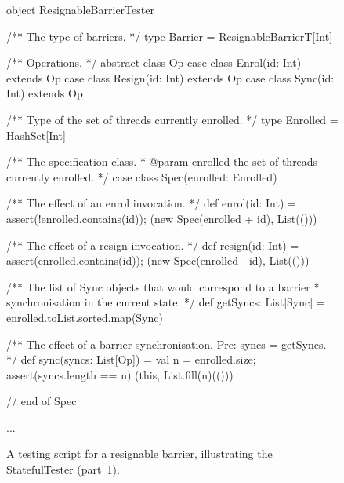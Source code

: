 
\begin{figure}
\begin{scala}
object ResignableBarrierTester{
  /** The type of barriers. */
  type Barrier = ResignableBarrierT[Int]

  /** Operations. */
  abstract class Op
  case class Enrol(id: Int) extends Op
  case class Resign(id: Int) extends Op
  case class Sync(id: Int) extends Op

  /** Type of the set of threads currently enrolled. */
  type Enrolled = HashSet[Int]

  /** The specification class.
    * @param enrolled the set of threads currently enrolled.  */
  case class Spec(enrolled: Enrolled){
    /** The effect of an enrol invocation. */
    def enrol(id: Int) = { 
      assert(!enrolled.contains(id)); (new Spec(enrolled + id), List(()))
    }

    /** The effect of a resign invocation. */
    def resign(id: Int) = {
      assert(enrolled.contains(id)); (new Spec(enrolled - id), List(()))
    }

    /** The list of Sync objects that would correspond to a barrier
      * synchronisation in the current state. */
    def getSyncs: List[Sync] = enrolled.toList.sorted.map(Sync)

    /** The effect of a barrier synchronisation.  Pre: syncs = getSyncs.  */
    def sync(syncs: List[Op]) = {
      val n = enrolled.size; assert(syncs.length == n)
      (this, List.fill(n)(()))
    }
  } // end of Spec

  ...
}
\end{scala}
\caption{A testing script for a resignable barrier, illustrating the
  {\scalashape Stateful\-Tester} (part~1).  \label{fig:resignable-barrier-1}}
\end{figure}


